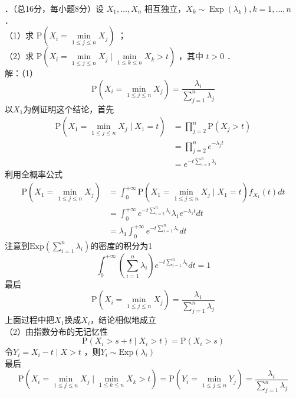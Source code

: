 \documentclass[UTF8]{ctexart}
\begin{document}
．（总16分，每小题8分）设 $X_{1}, \ldots, X_{n}$ 相互独立，$X_{k} \sim \operatorname{Exp}\left(\lambda_{k}\right), k=1, \ldots, n$ ．\\
（1）求 $\mathrm{P}\left(X_{i}=\min\limits_{1 \leq j \leq n} X_{j}\right)$ ；\\
（2）求 $\mathrm{P}\left(X_{i}=\min\limits_{1 \leq j \leq n} X_{j} \mid \min\limits_{1 \leq k \leq n} X_{k}>t\right)$ ，其中 $t>0$ ．\\
解：（1）
\[
\mathrm{P}\left(X_{i}=\min\limits_{1 \leq j \leq n} X_{j}\right)=\frac{\lambda_i}{\sum\limits_{j=1}^n \lambda_j}
\]
以$X_1$为例证明这个结论，首先
\begin{align*}
	\mathrm{P}\left(X_{1}=\min\limits_{1 \leq j \leq n} X_{j}\mid X_1=t \right) & =\prod\limits_{j=2}^{n} \mathrm{P}(X_j>t) \\
	 & = \prod\limits_{j=2}^{n} e^{-\lambda_j t}\\
	 &=e^{-t \sum\limits_{i=2}^{n} \lambda_i}
\end{align*}
利用全概率公式
\begin{align*}
	\mathrm{P}\left(X_{1}=\min\limits_{1 \leq j \leq n} X_{j}\right) & = \int_{0}^{+\infty} 	\mathrm{P}\left(X_{1}=\min\limits_{1 \leq j \leq n} X_{j}\mid X_1=t \right) f_{X_1}(t)dt  \\
	 & =\int_{0}^{+\infty} e^{-t \sum\limits_{i=2}^{n} \lambda_i} \lambda_1 e^{-\lambda_1 t}dt\\
	 &=\lambda_1 \int_{0}^{+\infty} e^{-t \sum\limits_{i=1}^{n} \lambda_i}  dt
\end{align*}
注意到$\mathrm{Exp}\left( \sum_{i=1}^{n} \lambda_i \right) $的密度的积分为1
\[
\int_{0}^{+\infty} \left(\sum_{i=1}^{n} \lambda_i \right) e^{-t \sum\limits_{i=1}^{n} \lambda_i}  dt=1
\]
最后
\[
\mathrm{P}\left(X_{i}=\min\limits_{1 \leq j \leq n} X_{j}\right)=\frac{\lambda_1}{\sum\limits_{j=1}^n \lambda_j}
\]
上面过程中把$X_1$换成$X_i$，结论相似地成立\\
（2）由指数分布的无记忆性
\[
\mathrm{P}\left(X_i>s+t \mid X_i>t \right) = \mathrm{P}(X_i>s) 
\]
令$Y_i=X_i-t\mid X>t$ ，则$Y_i\sim \mathrm{Exp}(\lambda_i)$\\
最后
\[
\mathrm{P}\left(X_{i}=\min\limits_{1 \leq j \leq n} X_{j} \mid \min\limits_{1 \leq k \leq n} X_{k}>t\right)=\mathrm{P}\left(Y_{i}=\min\limits_{1 \leq j \leq n} Y_{j}\right)=\frac{\lambda_i}{\sum\limits_{j=1}^n \lambda_j}
\]\\
\end{document}
